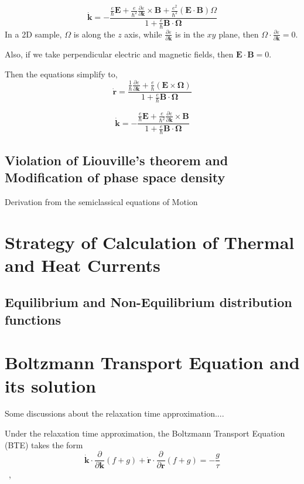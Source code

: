 \documentclass[aps,pra,amsmath,amssymb,floatfix,twocolumn, amsmath, superscriptaddress, twocolumn]{revtex4-2}
\newcommand{\bvec}[1]{{\mathbf #1}}
\begin{document}
\begin{equation}
\dot{\bvec{k}} = -\frac{\frac{e}{\hbar} \bvec{E} +\frac{e}{\hbar^2} \frac{\partial \varepsilon}{\partial \bvec{k}} \times \bvec{B} + \frac{e^2}{\hbar^2} (\bvec{E}\cdot\bvec{B})\Omega}{1 + \frac{e}{\hbar} \bvec{B}\cdot\bvec{\Omega}}
\end{equation}
In a 2D sample, $\Omega$ is along the $z$ axis, while $\frac{\partial \varepsilon}{\partial \bvec{k}}$ is in the $xy$ plane, then $\Omega \cdot \frac{\partial \varepsilon}{\partial \bvec{k}} = 0$.

Also, if we take perpendicular electric and magnetic fields, then $\bvec{E}\cdot \bvec{B} = 0$.

Then the equations simplify to,
\begin{equation}
\dot{\bvec{r}} = \frac{\frac{1}{\hbar} \frac{\partial \varepsilon}{\partial \bvec{k}} + \frac{e}{\hbar} (\bvec{E}\times\bvec{\Omega})}{1 + \frac{e}{\hbar} \bvec{B}\cdot\bvec{\Omega}}
\end{equation}

\begin{equation}
\dot{\bvec{k}} = -\frac{\frac{e}{\hbar} \bvec{E} +\frac{e}{\hbar^2} \frac{\partial \varepsilon}{\partial \bvec{k}} \times \bvec{B}}{1 + \frac{e}{\hbar} \bvec{B}\cdot\bvec{\Omega}}
\end{equation}
\subsection{Violation of Liouville's theorem and Modification of phase space density}
Derivation from the semiclassical equations of Motion
\section{Strategy of Calculation of Thermal and Heat Currents}
\subsection{Equilibrium and Non-Equilibrium distribution functions}
\section{Boltzmann Transport Equation and its solution}
Some discussions about the relaxation time approximation....

Under the relaxation time approximation, the Boltzmann Transport Equation (BTE) takes the form
\begin{equation}
\dot{\bvec{k}}\cdot\frac{\partial}{\partial \bvec{k}} (f + g) + \dot{\bvec{r}}\cdot\frac{\partial}{\partial \bvec{r}} (f + g) = -\frac{g}{\tau}
\end{equation}~\label{Eq:BTE},
\end{document}
